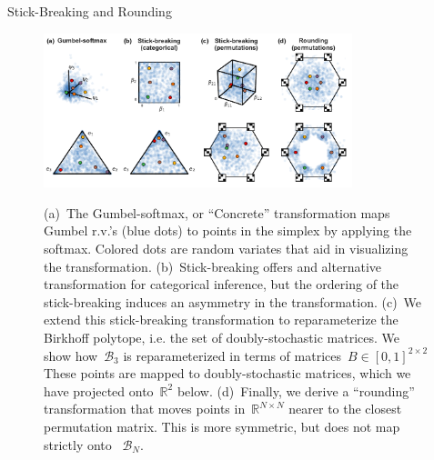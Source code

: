 \documentclass[final]{beamer}
\begin{document}
\begin{frame}[allowframebreaks]
\begin{minipage}[htp][1\textheight][t]{\textwidth}
\begin{columns}[t]
\begin{column}{.5\linewidth}
\begin{block}{Stick-Breaking and Rounding}
           	 \begin{figure}
	    	\centering
		{\includegraphics[width=0.8\textwidth]{figs/Figure1.pdf}}
		 \caption{(a)~The Gumbel-softmax, or ``Concrete'' transformation maps
    Gumbel r.v.'s (blue dots) to points in the
    simplex by applying the softmax.  Colored
    dots are random variates that aid in visualizing the
    transformation.  (b)~Stick-breaking offers and alternative
    transformation for categorical inference, but the ordering of
    the stick-breaking induces an asymmetry in the transformation.
    (c)~We extend this stick-breaking transformation to reparameterize
    the Birkhoff polytope, i.e. the set of doubly-stochastic
    matrices. We show how~$\mathcal{B}_3$ is reparameterized in terms of
    matrices~$B \in [0,1]^{2 \times 2}$ These points are mapped to
    doubly-stochastic matrices, which we have projected
    onto~$\mathbb{R}^2$ below.  (d)~Finally, we derive a ``rounding'' transformation
    that moves points in~$\mathbb{R}^{N \times N}$ nearer to the closest
    permutation matrix. This is more symmetric, but does not map strictly onto ~$\mathcal{B}_N$.
  }
\label{fig:transforms}
	\end{figure}


	  
\end{block}
	

\end{column}
\end{columns}
\end{minipage}
\end{frame}
\end{document}
